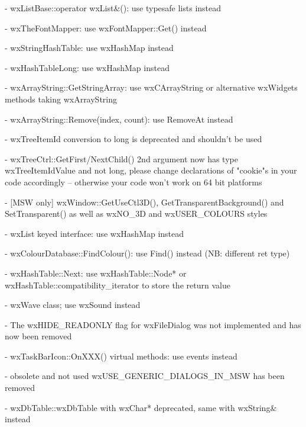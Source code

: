 - wxListBase::operator wxList&(): use typesafe lists instead

- wxTheFontMapper: use wxFontMapper::Get() instead

- wxStringHashTable: use wxHashMap instead

- wxHashTableLong: use wxHashMap instead

- wxArrayString::GetStringArray: use wxCArrayString or alternative wxWidgets
                                 methods taking wxArrayString

- wxArrayString::Remove(index, count): use RemoveAt instead

- wxTreeItemId conversion to long is deprecated and shouldn't be used

- wxTreeCtrl::GetFirst/NextChild() 2nd argument now has type wxTreeItemIdValue
  and not long, please change declarations of "cookie"s in your code
  accordingly -- otherwise your code won't work on 64 bit platforms

- [MSW only] wxWindow::GetUseCtl3D(), GetTransparentBackground() and
             SetTransparent() as well as wxNO\_3D and wxUSER\_COLOURS styles

- wxList keyed interface: use wxHashMap instead

- wxColourDatabase::FindColour(): use Find() instead (NB: different ret type)

- wxHashTable::Next: use wxHashTable::Node* or
                     wxHashTable::compatibility\_iterator to store the return
                     value

- wxWave class; use wxSound instead

- The wxHIDE\_READONLY flag for wxFileDialog was not implemented
  and has now been removed

- wxTaskBarIcon::OnXXX() virtual methods: use events instead

- obsolete and not used wxUSE\_GENERIC\_DIALOGS\_IN\_MSW has been removed

- wxDbTable::wxDbTable with wxChar* deprecated, same with wxString& instead
